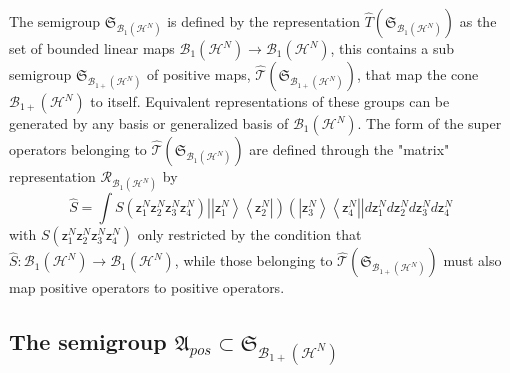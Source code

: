\documentclass[aps,preprint]{revtex4}%
\begin{document}
The semigroup $\mathfrak{S}_{\mathcal{B}_{1}\left(  \mathcal{H}^{N}\right)  }$
is defined by the representation $\hat{T}\left(  \mathfrak{S}_{\mathcal{B}%
_{1}\left(  \mathcal{H}^{N}\right)  }\right)  $ as the set of bounded linear
maps $\mathcal{B}_{1}\left(  \mathcal{H}^{N}\right)  \rightarrow
\mathcal{B}_{1}\left(  \mathcal{H}^{N}\right)  $, this contains a sub
semigroup $\mathfrak{S}_{\mathcal{B}_{1+}\left(  \mathcal{H}^{N}\right)  }$ of
positive maps, $\mathcal{\hat{T}}\left(  \mathfrak{S}_{\mathcal{B}_{1+}\left(
\mathcal{H}^{N}\right)  }\right)  $, that map the cone $\mathcal{B}%
_{1+}\left(  \mathcal{H}^{N}\right)  $ to itself. Equivalent representations
of these groups can be generated by any basis or generalized basis of
$\mathcal{B}_{1}\left(  \mathcal{H}^{N}\right)  $. The form of the super
operators belonging to $\mathcal{\hat{T}}\left(  \mathfrak{S}_{\mathcal{B}%
_{1}\left(  \mathcal{H}^{N}\right)  }\right)  $ are defined through the
"matrix" representation $\mathcal{R}_{\mathcal{B}_{1}\left(  \mathcal{H}%
^{N}\right)  }$ by%
\begin{equation}
\hat{S}=%
{\displaystyle\int}
S\left(  \mathsf{z}_{1}^{N}\mathsf{z}_{2}^{N}\mathsf{z}_{3}^{N}\mathsf{z}%
_{4}^{N}\right)  \left\vert \left\vert \mathsf{z}_{1}^{N}\right\rangle
\left\langle \mathsf{z}_{2}^{N}\right\vert \right)  \left(  \left\vert
\mathsf{z}_{3}^{N}\right\rangle \left\langle \mathsf{z}_{4}^{N}\right\vert
\right\vert d\mathsf{z}_{1}^{N}d\mathsf{z}_{2}^{N}d\mathsf{z}_{3}%
^{N}d\mathsf{z}_{4}^{N}%
\end{equation}
with $S\left(  \mathsf{z}_{1}^{N}\mathsf{z}_{2}^{N}\mathsf{z}_{3}%
^{N}\mathsf{z}_{4}^{N}\right)  $ only restricted by the condition that
$\hat{S}:\mathcal{B}_{1}\left(  \mathcal{H}^{N}\right)  \rightarrow
\mathcal{B}_{1}\left(  \mathcal{H}^{N}\right)  $, while those belonging to
$\mathcal{\hat{T}}\left(  \mathfrak{S}_{\mathcal{B}_{1+}\left(  \mathcal{H}%
^{N}\right)  }\right)  $ must also map positive operators to positive operators.

\subsection{The semigroup $\mathfrak{A}_{pos}\subset\mathfrak{S}%
_{\mathcal{B}_{1+}\left(  \mathcal{H}^{N}\right)  }$}

\label{uker}
\end{document}
